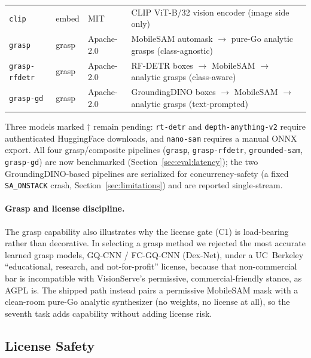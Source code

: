 \begin{table}[t]
\begin{tabular}{llll}
    \texttt{clip}             & embed         & MIT        & CLIP ViT-B/32 vision encoder (image side only) \\
    \texttt{grasp}            & grasp         & Apache-2.0 & MobileSAM automask $\to$ pure-Go analytic grasps (class-agnostic) \\
    \texttt{grasp-rfdetr}     & grasp         & Apache-2.0 & RF-DETR boxes $\to$ MobileSAM $\to$ analytic grasps (class-aware) \\
    \texttt{grasp-gd}         & grasp         & Apache-2.0 & GroundingDINO boxes $\to$ MobileSAM $\to$ analytic grasps (text-prompted) \\
    \bottomrule
  \end{tabular}
\end{table}

\noindent
Three models marked $\dagger$ remain pending: \texttt{rt-detr} and
\texttt{depth-anything-v2} require authenticated HuggingFace downloads, and
\texttt{nano-sam} requires a manual ONNX export.  All four grasp/composite pipelines
(\texttt{grasp}, \texttt{grasp-rfdetr}, \texttt{grounded-sam}, \texttt{grasp-gd}) are now
benchmarked (Section~\ref{sec:eval:latency}); the two GroundingDINO-based pipelines are
serialized for concurrency-safety (a fixed \texttt{SA\_ONSTACK} crash, Section~\ref{sec:limitations})
and are reported single-stream.

\paragraph{Grasp and license discipline.}
The grasp capability also illustrates why the license gate (C1) is load-bearing rather than
decorative.  In selecting a grasp method we rejected the most accurate learned grasp
models, GQ-CNN / FC-GQ-CNN (Dex-Net), under a UC~Berkeley ``educational, research, and
not-for-profit'' license, because that non-commercial bar is incompatible with
VisionServe's permissive, commercial-friendly stance, as AGPL is.  The shipped path
instead pairs a permissive MobileSAM mask with a clean-room pure-Go analytic synthesizer (no
weights, no license at all), so the seventh task adds capability without adding license risk.

\subsection{License Safety}
\label{sec:catalog:license}

